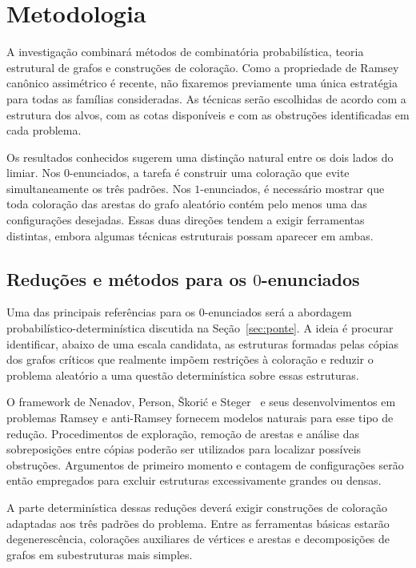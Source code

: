 \documentclass[11pt,a4paper]{article}
\theoremstyle{plain}
\theoremstyle{definition}
\begin{document}
\section{Metodologia}
\label{sec:metodologia}


A investigação combinará métodos de combinatória probabilística,
teoria estrutural de grafos e construções de coloração. Como a
propriedade de Ramsey canônico assimétrico é recente, não fixaremos
previamente uma única estratégia para todas as famílias consideradas.
As técnicas serão escolhidas de acordo com a estrutura dos alvos,
com as cotas disponíveis e com as obstruções identificadas em cada
problema.

Os resultados conhecidos sugerem uma distinção natural entre os dois
lados do limiar. Nos $0$-enunciados, a tarefa é construir uma coloração
que evite simultaneamente os três padrões. Nos $1$-enunciados, é
necessário mostrar que toda coloração das arestas do grafo aleatório
contém pelo menos uma das configurações desejadas. Essas duas direções
tendem a exigir ferramentas distintas, embora algumas técnicas
estruturais possam aparecer em ambas.


\subsection{Reduções e métodos para os \texorpdfstring{$0$}{0}-enunciados}


Uma das principais referências para os $0$-enunciados será a
abordagem probabilístico-determinística discutida na
Seção~\ref{sec:ponte}. A ideia é procurar identificar, abaixo de uma
escala candidata, as estruturas formadas pelas cópias dos grafos
críticos que realmente impõem restrições à coloração e reduzir o
problema aleatório a uma questão determinística sobre essas estruturas.

O framework de Nenadov, Person, Škorić e Steger~\cite{NPSS} e seus
desenvolvimentos em problemas Ramsey e anti-Ramsey fornecem modelos
naturais para esse tipo de redução. Procedimentos de exploração,
remoção de arestas e análise das sobreposições entre cópias poderão
ser utilizados para localizar possíveis obstruções. Argumentos de
primeiro momento e contagem de configurações serão então empregados
para excluir estruturas excessivamente grandes ou densas.

A parte determinística dessas reduções deverá exigir construções de
coloração adaptadas aos três padrões do problema. Entre as ferramentas
básicas estarão degenerescência, colorações auxiliares de vértices e
arestas e decomposições de grafos em subestruturas mais simples.
\end{document}

